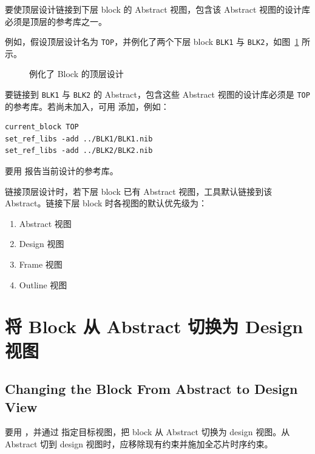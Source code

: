 要使顶层设计链接到下层 block 的 Abstract 视图，包含该 Abstract 视图的设计库必须是顶层的参考库之一。

例如，假设顶层设计名为 \texttt{TOP}，并例化了两个下层 block \texttt{BLK1} 与 \texttt{BLK2}，如图~\ref{fig:hier-top-blocks} 所示。

\begin{figure}[htbp]
\centering
{}
\caption{例化了 Block 的顶层设计}
\label{fig:hier-top-blocks}
\end{figure}

要链接到 \texttt{BLK1} 与 \texttt{BLK2} 的 Abstract，包含这些 Abstract 视图的设计库必须是 \texttt{TOP} 的参考库。若尚未加入，可用  添加，例如：
\begin{lstlisting}
current_block TOP
set_ref_libs -add ../BLK1/BLK1.nib
set_ref_libs -add ../BLK2/BLK2.nib
\end{lstlisting}

要用  报告当前设计的参考库。

链接顶层设计时，若下层 block 已有 Abstract 视图，工具默认链接到该 Abstract。链接下层 block 时各视图的默认优先级为：
\begin{enumerate}
  \item Abstract 视图
  \item Design 视图
  \item Frame 视图
  \item Outline 视图
\end{enumerate}

\section{将 Block 从 Abstract 切换为 Design 视图}
\subsection*{Changing the Block From Abstract to Design View}

要用 ，并通过  指定目标视图，把 block 从 Abstract 切换为 design 视图。从 Abstract 切到 design 视图时，应移除现有约束并施加全芯片时序约束。

